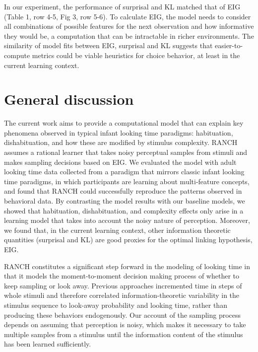 \documentclass[
  man,floatsintext]{apa6}
\begin{document}
In our experiment, the performance of surprisal and KL matched that of EIG (Table 1, row 4-5, Fig 3, row 5-6). To calculate EIG, the model needs to consider all combinations of possible features for the next observation and how informative they would be, a computation that can be intractable in richer environments. The similarity of model fits between EIG, surprisal and KL suggests that easier-to-compute metrics could be viable heuristics for choice behavior, at least in the current learning context.

\hypertarget{general-discussion}{%
\section{General discussion}\label{general-discussion}}

The current work aims to provide a computational model that can explain key phenomena observed in typical infant looking time paradigms: habituation, dishabituation, and how these are modified by stimulus complexity. RANCH assumes a rational learner that takes noisy perceptual samples from stimuli and makes sampling decisions based on EIG. We evaluated the model with adult looking time data collected from a paradigm that mirrors classic infant looking time paradigms, in which participants are learning about multi-feature concepts, and found that RANCH could successfully reproduce the patterns observed in behavioral data. By contrasting the model results with our baseline models, we showed that habituation, dishabituation, and complexity effects only arise in a learning model that takes into account the noisy nature of perception. Moreover, we found that, in the current learning context, other information theoretic quantities (surprisal and KL) are good proxies for the optimal linking hypothesis, EIG.

RANCH constitutes a significant step forward in the modeling of looking time in that it models the moment-to-moment decision making process of whether to keep sampling or look away. Previous approaches incremented time in steps of whole stimuli and therefore correlated information-theoretic variability in the stimulus sequence to look-away probability and looking time, rather than producing these behaviors endogenously. Our account of the sampling process depends on assuming that perception is noisy, which makes it necessary to take multiple samples from a stimulus until the information content of the stimulus has been learned sufficiently.
\end{document}
